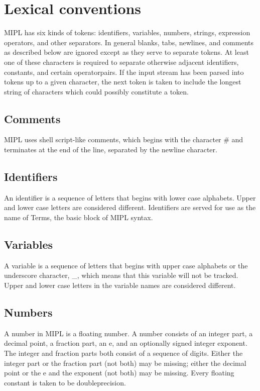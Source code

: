 \documentclass[prodmode,acmtecs]{acmsmall}
\begin{document}
\section{Lexical conventions}
MIPL has six kinds of tokens: identifiers, variables, numbers, strings,
expression operators, and other separators.  In general blanks, tabs,
newlines, and comments as described below are ignored except as they
serve to separate tokens. At least one of these characters is required
to separate otherwise adjacent identifiers, constants, and certain
operatorpairs.  If the input stream has been parsed into tokens up
to a given character, the next token is taken to include the longest
string of characters which could possibly constitute a token.

\subsection{Comments}

MIPL uses shell script-like comments, which begins with the character
\# and terminates at the end of the line, separated by the newline character.

\subsection{Identifiers}

An identifier is a sequence of letters that begins with lower case alphabets.
Upper and lower case letters are considered different.   Identifiers are
served for use as the name of Terms, the basic block of MIPL syntax.

\subsection{Variables}

A variable is a sequence of letters that begins with upper case alphabets
or the underscore character, \_, which means that this variable will not
be tracked.  Upper and lower case letters in the variable names are
considered different. 

\subsection{Numbers}

A number in MIPL is a floating number.  A number consists of an integer
part, a decimal point, a fraction part, an e, and an optionally signed integer
exponent. The integer and fraction parts both consist of a sequence of digits.
Either the integer part or the fraction
part (not both) may be missing; either the decimal point or the
e and the exponent (not both) may be missing.
Every floating constant is taken to be doubleprecision.
\end{document}
